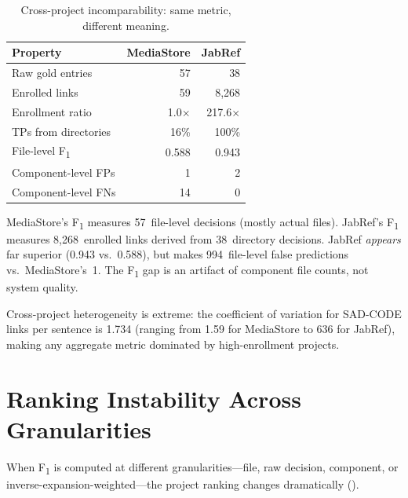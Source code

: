 \documentclass[11pt,a4paper]{report}
\newcommand{\fone}{F\textsubscript{1}\xspace}
\begin{document}
\begin{table}[h]
\caption{Cross-project incomparability: same metric, different meaning.}
\label{tab:incomparable}
\centering\small
\begin{tabular}{lrr}
\toprule
\textbf{Property} & \textbf{MediaStore} & \textbf{JabRef} \\
\midrule
Raw gold entries        & 57     & 38     \\
Enrolled links          & 59     & 8,268  \\
Enrollment ratio        & 1.0$\times$ & 217.6$\times$ \\
TPs from directories    & 16\%   & 100\%  \\
File-level \fone        & 0.588  & 0.943  \\
Component-level FPs     & 1      & 2      \\
Component-level FNs     & 14     & 0      \\
\bottomrule
\end{tabular}
\end{table}

MediaStore's \fone measures 57~file-level decisions (mostly actual files).
JabRef's \fone measures 8,268~enrolled links derived from 38~directory
decisions. JabRef \emph{appears} far superior (0.943 vs.\ 0.588), but makes
994~file-level false predictions vs.\ MediaStore's~1. The \fone gap is an
artifact of component file counts, not system quality.

Cross-project heterogeneity is extreme: the coefficient of variation for
SAD-CODE links per sentence is 1.734 (ranging from 1.59 for MediaStore to 636
for JabRef), making any aggregate metric dominated by high-enrollment projects.


\section{Ranking Instability Across Granularities}
\label{sec:ineq:ranking}

When \fone is computed at different granularities---file, raw decision,
component, or inverse-expansion-weighted---the project ranking changes
dramatically ().
\end{document}
